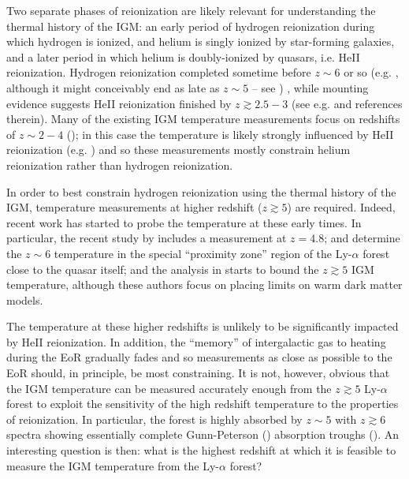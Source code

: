 Two separate phases of reionization are likely relevant for understanding the thermal history of the IGM: an early period
of hydrogen reionization during which hydrogen is ionized, and helium is singly ionized by star-forming galaxies, and a later period 
in which helium is doubly-ionized by quasars, i.e. HeII reionization. Hydrogen reionization completed sometime 
before $z \sim 6$ or so (e.g. \citealt{Fan:2005es}, although it might conceivably end
as late as $z \sim 5$ -- see \citealt{McGreer:2011dm,Mesinger:2009mv,Lidz:2007mz}) ,
while mounting evidence suggests HeII reionization finished by $z \gtrsim 2.5-3$ (see e.g. \citealt{Worseck:2011qk,Syphers:2011uw} and references therein). 
Many of the existing IGM temperature measurements focus on redshifts of
$z \sim 2-4$ (\citealt{Schaye:1999vr,Ricotti:1999hx,McDonald:2000nn,Zaldarriaga:2000mz,Theuns:2001my,Lidz:2009ca});
in this case the temperature is likely strongly influenced by HeII
reionization (e.g. \citealt{McQuinn:2008am}) and so these measurements
mostly constrain helium reionization rather than hydrogen reionization.

In order to best constrain hydrogen reionization using the
thermal history of the IGM, temperature measurements
at higher redshift ($z \gtrsim 5$) are required. Indeed, recent work
has started to probe the temperature at these early times. In particular,
the recent study by \citet{Becker:2012aq} includes a measurement
at $z=4.8$; \citet{Bolton:2011ck} and \citet{Raskutti:2012qz} determine
the $z \sim 6$ temperature in the special ``proximity zone'' region of the Ly-$\alpha$
forest close to the quasar itself; and the analysis in \citet{Viel:2013fqw} starts to bound
the $z \gtrsim 5$ IGM temperature, although these authors focus on placing
limits on warm dark matter models.

The temperature at these higher redshifts is unlikely to be significantly impacted by HeII reionization. 
In addition, the ``memory'' of intergalactic gas to heating during the EoR gradually fades and so measurements as close as possible
to the EoR should, in principle, be most constraining.
It is not, however, obvious that the IGM temperature can be measured accurately enough 
from the $z \gtrsim 5$ Ly-$\alpha$ forest to exploit the sensitivity of the high redshift temperature to the properties of reionization. In particular, the forest is highly absorbed by $z \sim 5$ with $z \gtrsim 6$ spectra showing
essentially complete Gunn-Peterson (\citealt{1965ApJ...142.1633G}) absorption troughs (\citealt{Becker:2001ee,Fan:2005es}). An interesting question is then: what is the highest redshift at which it is feasible
to measure the IGM temperature from the Ly-$\alpha$ forest?

